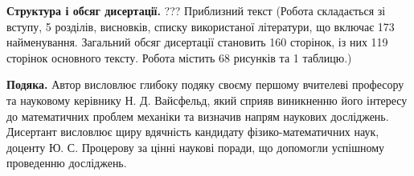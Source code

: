 \textbf{Структура і обсяг дисертації.}
???
Приблизний текст (Робота складається зі вступу, 5 розділів, висновків, списку використаної літератури, що включає 173 найменування. Загальний обсяг дисертації становить 160 сторінок, із них 119 сторінок основного тексту. Робота містить 68 рисунків та 1 таблицю.)

\textbf{Подяка.}
Автор висловлює глибоку подяку своєму першому вчителеві професору та науковому керівнику Н. Д. Вайсфельд, який сприяв виникненню його інтересу до математичних проблем механіки та визначив напрям наукових досліджень.
Дисертант висловлює щиру вдячність кандидату фізико-математичних наук, доценту Ю. С. Процерову за цінні наукові поради, що допомогли успішному проведенню досліджень.